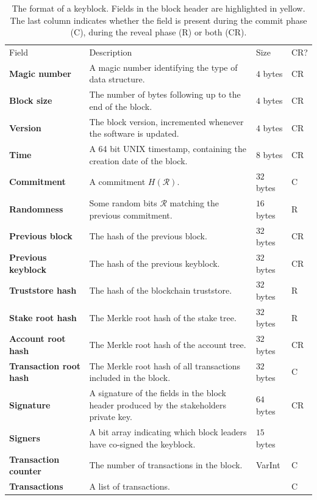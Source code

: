 \documentclass{style/kththesis}
\begin{document}
\begin{appendices}
\begin{longtabu}{lXll}
\caption{The format of a keyblock. Fields in the block header are highlighted in yellow. The last column indicates whether the field is present during the commit phase (C), during the reveal phase (R) or both (CR). } \\
\cmidrule(r){1-4}
Field & Description & Size & CR? \\ 
\cmidrule(r){1-4}
\textbf{Magic number} & A magic number identifying the type of data structure. & $4$ bytes & CR \\
\textbf{Block size} & The number of bytes following up to the end of the block. & $4$ bytes & CR \\
 \textbf{Version} & The block version, incremented whenever the software is updated. & $4$ bytes & CR \\
 \textbf{Time} & A 64 bit UNIX timestamp, containing the creation date of the block. & $8$ bytes & CR \\
 \textbf{Commitment} & A commitment $H(\mathcal{R})$. & $32$ bytes & C \\
 \textbf{Randomness} & Some random bits $\mathcal{R}$ matching the previous commitment. & $16$ bytes & R \\
 \textbf{Previous block} & The hash of the previous block. & $32$ bytes & CR \\
 \textbf{Previous keyblock} & The hash of the previous keyblock. & $32$ bytes & CR \\
 \textbf{Truststore hash} & The hash of the blockchain truststore. & $32$ bytes & R \\
 \textbf{Stake root hash} & The Merkle root hash of the stake tree. & $32$ bytes & R \\
 \textbf{Account root hash} & The Merkle root hash of the account tree. & $32$ bytes & CR \\
 \textbf{Transaction root hash} & The Merkle root hash of all transactions included in the block. & $32$ bytes & C \\
 \textbf{Signature} & A signature of the fields in the block header produced by the stakeholders private key. & $64$ bytes & CR \\
 \textbf{Signers} & A bit array indicating which block leaders have co-signed the keyblock. & $15$ bytes \\
\textbf{Transaction counter} & The number of transactions in the block. & VarInt & C \\
\textbf{Transactions} & A list of transactions. & ~ & C 
\end{longtabu}


\end{appendices}
\end{document}
